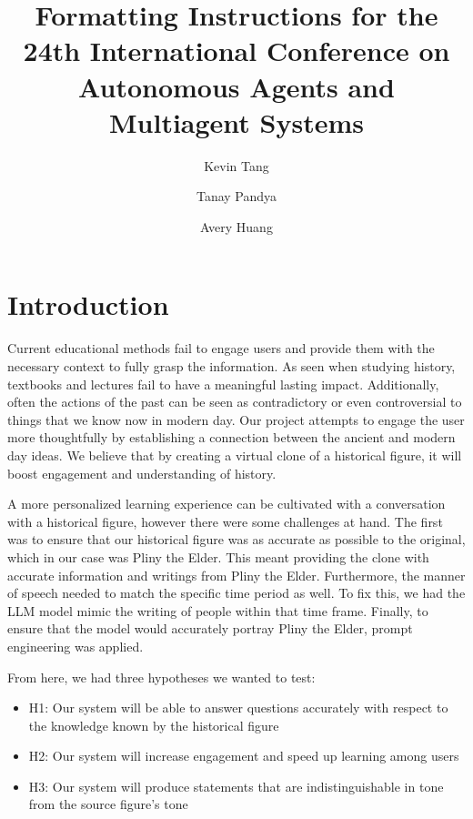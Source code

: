 \documentclass[sigconf]{aamas}
\title[AAMAS-2025 Formatting Instructions]{Formatting Instructions for the 24th International Conference on Autonomous Agents and Multiagent Systems}
\author{Kevin Tang}
\affiliation{
  \institution{Northeastern University}
  \city{Boston}
  \country{United States}}
\author{Tanay Pandya}
\affiliation{
  \institution{Northeastern University}
  \city{Boston}
  \country{United States}}
\author{Avery Huang}
\affiliation{
  \institution{Northeastern University}
  \city{Boston}
  \country{United States}}
\begin{document}

\pagestyle{fancy}
\fancyhead{}


\maketitle 


\section{Introduction}

Current educational methods fail to engage users and provide them with the necessary context to fully grasp the information. As seen when studying history, textbooks and lectures fail to have a meaningful lasting impact. Additionally, often the actions of the past can be seen as contradictory or even controversial to things that we know now in modern day. Our project attempts to engage the user more thoughtfully by establishing a connection between the ancient and modern day ideas. We believe that by creating a virtual clone of a historical figure, it will boost engagement and understanding of history.

A more personalized learning experience can be cultivated with a conversation with a historical figure, however there were some challenges at hand. The first was to ensure that our historical figure was as accurate as possible to the original, which in our case was Pliny the Elder. This meant providing the clone with accurate information and writings from Pliny the Elder. Furthermore, the manner of speech needed to match the specific time period as well. To fix this, we had the LLM model mimic the writing of people within that time frame. Finally, to ensure that the model would accurately portray Pliny the Elder, prompt engineering was applied.

From here, we had three hypotheses we wanted to test:

\begin{itemize}
    \item H1: Our system will be able to answer questions accurately with respect to the knowledge known by the historical figure
    \item H2: Our system will increase engagement and speed up learning among users
    \item H3: Our system will produce statements that are indistinguishable in tone from the source figure’s tone
\end{itemize}
    
\end{document}
